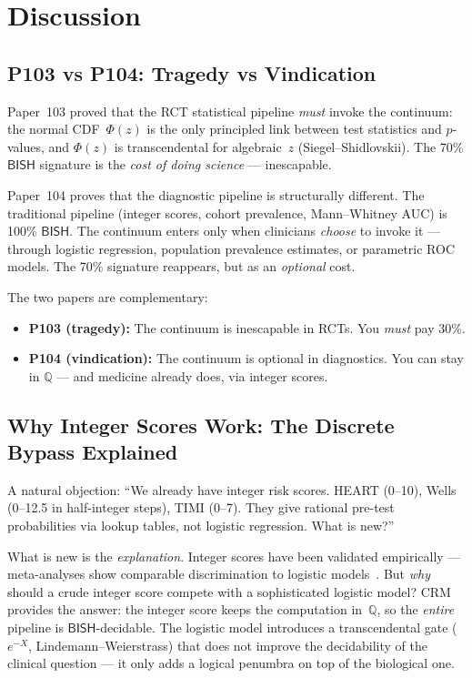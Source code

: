 \documentclass[11pt,a4paper]{article}
\theoremstyle{plain}
\theoremstyle{definition}
\newcommand{\BISH}{\textsf{BISH}}
\newcommand{\Q}{\mathbb{Q}}
\begin{document}
\section{Discussion}\label{sec:discussion}

\subsection{P103 vs P104: Tragedy vs Vindication}

Paper~103 proved that the RCT statistical pipeline \emph{must} invoke the continuum: the normal CDF~$\Phi(z)$ is the only principled link between test statistics and $p$-values, and $\Phi(z)$ is transcendental for algebraic~$z$ (Siegel--Shidlovskii).  The 70\% $\BISH$ signature is the \emph{cost of doing science} --- inescapable.

Paper~104 proves that the diagnostic pipeline is structurally different.  The traditional pipeline (integer scores, cohort prevalence, Mann--Whitney AUC) is 100\% $\BISH$.  The continuum enters only when clinicians \emph{choose} to invoke it --- through logistic regression, population prevalence estimates, or parametric ROC models.  The 70\% signature reappears, but as an \emph{optional} cost.

The two papers are complementary:
\begin{itemize}[nosep]
\item \textbf{P103 (tragedy):} The continuum is inescapable in RCTs.  You \emph{must} pay 30\%.
\item \textbf{P104 (vindication):} The continuum is optional in diagnostics.  You can stay in $\Q$ --- and medicine already does, via integer scores.
\end{itemize}

\subsection{Why Integer Scores Work: The Discrete Bypass Explained}

A natural objection: ``We already have integer risk scores.  HEART (0--10), Wells (0--12.5 in half-integer steps), TIMI (0--7).  They give rational pre-test probabilities via lookup tables, not logistic regression.  What is new?''

What is new is the \emph{explanation}.  Integer scores have been validated empirically --- meta-analyses show comparable discrimination to logistic models~\cite{backus2013,wells2001}.  But \emph{why} should a crude integer score compete with a sophisticated logistic model?  CRM provides the answer: the integer score keeps the computation in~$\Q$, so the \emph{entire} pipeline is $\BISH$-decidable.  The logistic model introduces a transcendental gate ($e^{-X}$, Lindemann--Weierstrass) that does not improve the decidability of the clinical question --- it only adds a logical penumbra on top of the biological one.
\end{document}

